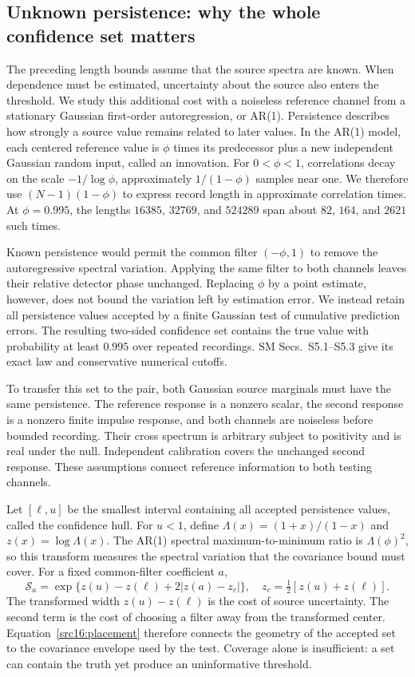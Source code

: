 \subsection{Unknown persistence: why the whole confidence set matters}\label{src16:main}
The preceding length bounds assume that the source spectra are known. When dependence must be estimated, uncertainty about the source also enters the threshold. We study this additional cost with a noiseless reference channel from a stationary Gaussian first-order autoregression, or AR(1). Persistence describes how strongly a source value remains related to later values. In the AR(1) model, each centered reference value is $\phi$ times its predecessor plus a new independent Gaussian random input, called an innovation. For $0<\phi<1$, correlations decay on the scale $-1/\log\phi$, approximately $1/(1-\phi)$ samples near one. We therefore use $(N-1)(1-\phi)$ to express record length in approximate correlation times. At $\phi=0.995$, the lengths $16385$, $32769$, and $524289$ span about $82$, $164$, and $2621$ such times.

Known persistence would permit the common filter $(-\phi,1)$ to remove the autoregressive spectral variation. Applying the same filter to both channels leaves their relative detector phase unchanged. Replacing $\phi$ by a point estimate, however, does not bound the variation left by estimation error. We instead retain all persistence values accepted by a finite Gaussian test of cumulative prediction errors. The resulting two-sided confidence set contains the true value with probability at least $0.995$ over repeated recordings. SM Secs.~S5.1--S5.3 give its exact law and conservative numerical cutoffs.

To transfer this set to the pair, both Gaussian source marginals must have the same persistence. The reference response is a nonzero scalar, the second response is a nonzero finite impulse response, and both channels are noiseless before bounded recording. Their cross spectrum is arbitrary subject to positivity and is real under the null. Independent calibration covers the unchanged second response. These assumptions connect reference information to both testing channels.

Let $[\ell,u]$ be the smallest interval containing all accepted persistence values, called the confidence hull. For $u<1$, define $\Lambda(x)=(1+x)/(1-x)$ and $z(x)=\log\Lambda(x)$. The AR(1) spectral maximum-to-minimum ratio is $\Lambda(\phi)^2$, so this transform measures the spectral variation that the covariance bound must cover. For a fixed common-filter coefficient $a$,
\begin{equation}\label{src16:placement}
 \mathcal S_a=\exp\{z(u)-z(\ell)+2|z(a)-z_c|\},\quad
 z_c=\tfrac12[z(u)+z(\ell)].
\end{equation}
The transformed width $z(u)-z(\ell)$ is the cost of source uncertainty. The second term is the cost of choosing a filter away from the transformed center. Equation~\eqref{src16:placement} therefore connects the geometry of the accepted set to the covariance envelope used by the test. Coverage alone is insufficient: a set can contain the truth yet produce an uninformative threshold.

